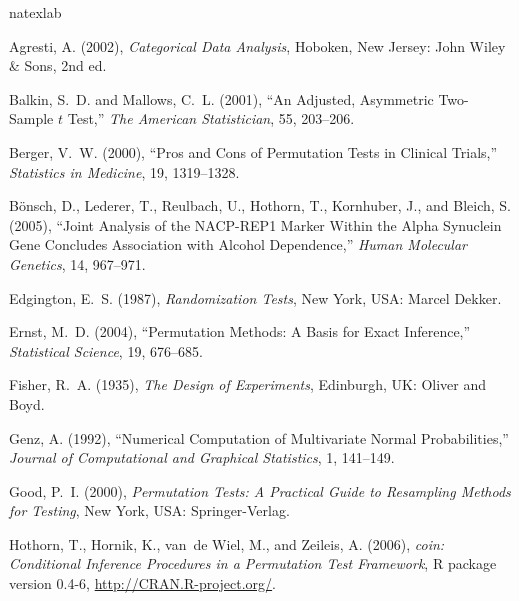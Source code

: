 \documentclass{article}
\begin{document}
\begin{thebibliography}{22}
\newcommand{\enquote}[1]{``#1''}
\expandafter\ifx\csname natexlab\endcsname\relax\def\natexlab#1{#1}\fi

Agresti, A. (2002), \textit{Categorical Data Analysis}, Hoboken, New Jersey:
  John Wiley \& Sons, 2nd ed.

Balkin, S.~D. and Mallows, C.~L. (2001), \enquote{An Adjusted, Asymmetric
  Two-Sample $t$ Test,} \textit{The American Statistician}, 55, 203--206.

Berger, V.~W. (2000), \enquote{Pros and Cons of Permutation Tests in Clinical
  Trials,} \textit{Statistics in Medicine}, 19, 1319--1328.

B{\"o}nsch, D., Lederer, T., Reulbach, U., Hothorn, T., Kornhuber, J., and
  Bleich, S. (2005), \enquote{Joint Analysis of the {NACP-REP1} Marker Within
  the Alpha Synuclein Gene Concludes Association with Alcohol Dependence,}
  \textit{Human Molecular Genetics}, 14, 967--971.

Edgington, E.~S. (1987), \textit{Randomization Tests}, New York, USA: Marcel
  Dekker.

Ernst, M.~D. (2004), \enquote{Permutation Methods: {A} Basis for Exact
  Inference,} \textit{Statistical Science}, 19, 676--685.

Fisher, R.~A. (1935), \textit{The Design of Experiments}, Edinburgh, UK: Oliver
  and Boyd.

Genz, A. (1992), \enquote{Numerical Computation of Multivariate Normal
  Probabilities,} \textit{Journal of Computational and Graphical Statistics},
  1, 141--149.

Good, P.~I. (2000), \textit{Permutation Tests: {A} Practical Guide to
  Resampling Methods for Testing}, New York, USA: Springer-Verlag.

Hothorn, T., Hornik, K., van~de Wiel, M., and Zeileis, A. (2006), \textit{coin:
  Conditional Inference Procedures in a Permutation Test Framework}, {R}
  package version 0.4-6, \url{http://CRAN.R-project.org/}.


\end{thebibliography}
\end{document}
